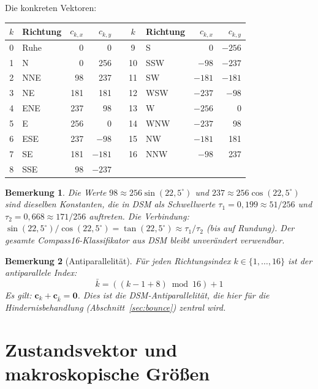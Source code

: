 \documentclass[11pt,a4paper]{article}
\newtheorem{remark}{Bemerkung}
\begin{document}
\noindent Die konkreten Vektoren:

\begin{center}
\small
\begin{tabular}{@{}clrrcclrr@{}}
\toprule
$k$ & Richtung & $c_{k,x}$ & $c_{k,y}$ & \quad &
$k$ & Richtung & $c_{k,x}$ & $c_{k,y}$ \\
\midrule
0  & Ruhe & 0 & 0       &  & 9  & S   & 0 & $-256$ \\
1  & N    & 0 & 256     &  & 10 & SSW & $-98$  & $-237$ \\
2  & NNE  & 98 & 237    &  & 11 & SW  & $-181$ & $-181$ \\
3  & NE   & 181 & 181   &  & 12 & WSW & $-237$ & $-98$ \\
4  & ENE  & 237 & 98    &  & 13 & W   & $-256$ & 0 \\
5  & E    & 256 & 0     &  & 14 & WNW & $-237$ & 98 \\
6  & ESE  & 237 & $-98$ &  & 15 & NW  & $-181$ & 181 \\
7  & SE   & 181 & $-181$&  & 16 & NNW & $-98$  & 237 \\
8  & SSE  & 98 & $-237$ &  &    &     &        &     \\
\bottomrule
\end{tabular}
\end{center}

\begin{remark}
Die Werte $98 \approx 256\sin(22{,}5^\circ)$ und $237 \approx 256\cos(22{,}5^\circ)$
sind dieselben Konstanten, die in DSM als Schwellwerte $\tau_1 = 0{,}199 \approx 51/256$
und $\tau_2 = 0{,}668 \approx 171/256$ auftreten.
Die Verbindung: $\sin(22{,}5^\circ)/\cos(22{,}5^\circ) = \tan(22{,}5^\circ) \approx \tau_1/\tau_2$ (bis auf Rundung).
Der gesamte Compass16-Klassifikator aus DSM bleibt unver\"andert verwendbar.
\end{remark}

\begin{remark}[Antiparallelit\"at]
F\"ur jeden Richtungsindex $k \in \{1,\ldots,16\}$ ist der antiparallele Index:
\begin{equation}
\bar{k} = ((k - 1 + 8) \bmod 16) + 1
\end{equation}
Es gilt: $\mathbf{c}_k + \mathbf{c}_{\bar{k}} = \mathbf{0}$. Dies ist die DSM-Antiparallelit\"at,
die hier f\"ur die Hindernisbehandlung (Abschnitt~\ref{sec:bounce}) zentral wird.
\end{remark}

\section{Zustandsvektor und makroskopische Gr\"o\ss en}
\end{document}

